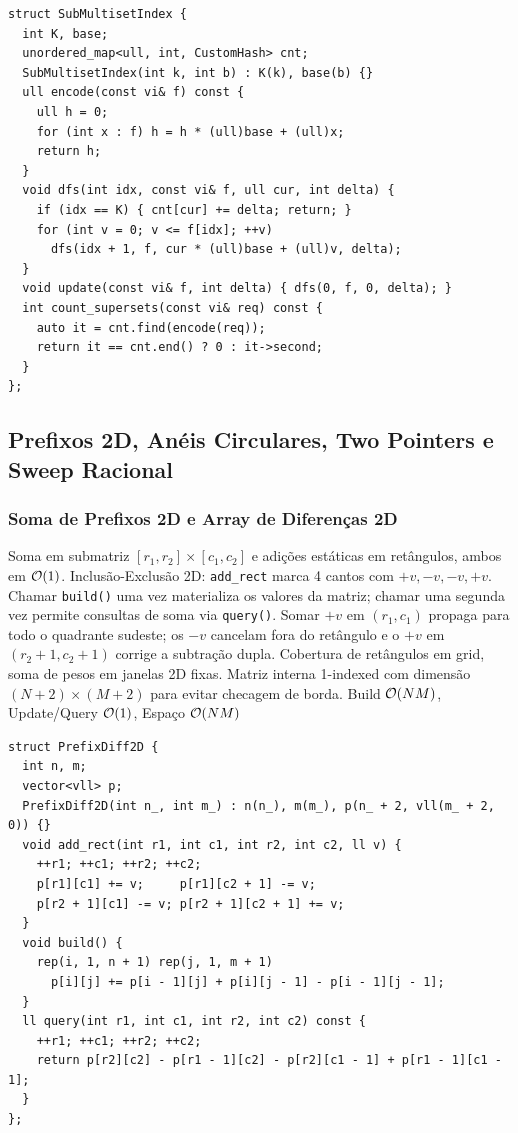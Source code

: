 \begin{lstlisting}
struct SubMultisetIndex {
  int K, base;
  unordered_map<ull, int, CustomHash> cnt;
  SubMultisetIndex(int k, int b) : K(k), base(b) {}
  ull encode(const vi& f) const {
    ull h = 0;
    for (int x : f) h = h * (ull)base + (ull)x;
    return h;
  }
  void dfs(int idx, const vi& f, ull cur, int delta) {
    if (idx == K) { cnt[cur] += delta; return; }
    for (int v = 0; v <= f[idx]; ++v)
      dfs(idx + 1, f, cur * (ull)base + (ull)v, delta);
  }
  void update(const vi& f, int delta) { dfs(0, f, 0, delta); }
  int count_supersets(const vi& req) const {
    auto it = cnt.find(encode(req));
    return it == cnt.end() ? 0 : it->second;
  }
};
\end{lstlisting}

\subsection{Prefixos 2D, Anéis Circulares, Two Pointers e Sweep Racional}

\subsubsection{Soma de Prefixos 2D e Array de Diferenças 2D}
\algobox
  {Soma em submatriz $[r_1, r_2] \times [c_1, c_2]$ e adições estáticas em retângulos, ambos em $\mathcal{O}(1)$.}
  {Inclusão-Exclusão 2D: \texttt{add\_rect} marca 4 cantos com $+v, -v, -v, +v$. Chamar \texttt{build()} uma vez materializa os valores da matriz; chamar uma segunda vez permite consultas de soma via \texttt{query()}.}
  {Somar $+v$ em $(r_1, c_1)$ propaga para todo o quadrante sudeste; os $-v$ cancelam fora do retângulo e o $+v$ em $(r_2+1, c_2+1)$ corrige a subtração dupla.}
  {Cobertura de retângulos em grid, soma de pesos em janelas 2D fixas.}
  {Matriz interna 1-indexed com dimensão $(N+2) \times (M+2)$ para evitar checagem de borda.}
  {Build $\mathcal{O}(NM)$, Update/Query $\mathcal{O}(1)$, Espaço $\mathcal{O}(NM)$}

\begin{lstlisting}
struct PrefixDiff2D {
  int n, m;
  vector<vll> p;
  PrefixDiff2D(int n_, int m_) : n(n_), m(m_), p(n_ + 2, vll(m_ + 2, 0)) {}
  void add_rect(int r1, int c1, int r2, int c2, ll v) {
    ++r1; ++c1; ++r2; ++c2;
    p[r1][c1] += v;     p[r1][c2 + 1] -= v;
    p[r2 + 1][c1] -= v; p[r2 + 1][c2 + 1] += v;
  }
  void build() {
    rep(i, 1, n + 1) rep(j, 1, m + 1)
      p[i][j] += p[i - 1][j] + p[i][j - 1] - p[i - 1][j - 1];
  }
  ll query(int r1, int c1, int r2, int c2) const {
    ++r1; ++c1; ++r2; ++c2;
    return p[r2][c2] - p[r1 - 1][c2] - p[r2][c1 - 1] + p[r1 - 1][c1 - 1];
  }
};
\end{lstlisting}

